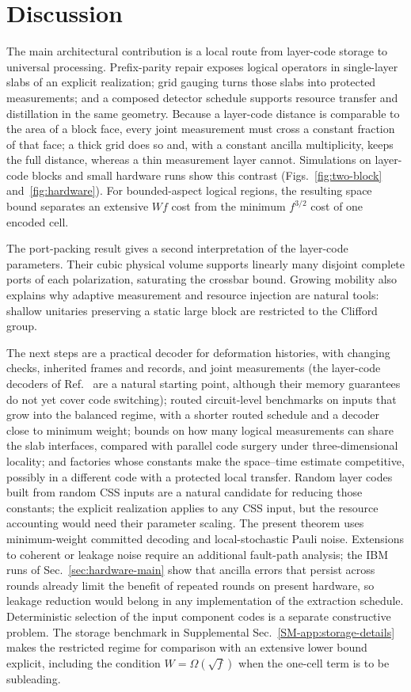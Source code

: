 \section{Discussion}
The main architectural contribution is a local route from layer-code storage
to universal processing. Prefix-parity repair exposes logical operators in
single-layer slabs of an explicit realization; grid gauging turns those slabs into protected
measurements; and a composed detector schedule supports resource transfer
and distillation in the same geometry. Because a layer-code distance is
comparable to the area of a block face, every joint measurement must cross a
constant fraction of that face; a thick grid does so and, with a constant
ancilla multiplicity, keeps the full distance, whereas a thin measurement
layer cannot.  Simulations on layer-code blocks and small hardware runs show
this contrast (Figs.~\ref{fig:two-block} and~\ref{fig:hardware}).  For
bounded-aspect logical regions,
the resulting space bound separates an extensive $Wf$ cost from the minimum
$f^{3/2}$ cost of one encoded cell.

The port-packing result gives a second interpretation of the layer-code
parameters. Their cubic physical volume supports linearly many disjoint
complete ports of each polarization, saturating the crossbar bound. Growing
mobility also explains why adaptive measurement and resource injection are
natural tools: shallow unitaries preserving a static large block are restricted
to the Clifford group.

The next steps are a practical decoder for deformation histories, with
changing checks, inherited frames and records, and joint measurements (the
layer-code decoders of Ref.~\cite{GuRandomLayerCodes2026} are a natural starting
point, although their memory guarantees do not yet cover code switching);
routed circuit-level benchmarks on inputs that grow into the balanced regime,
with a shorter routed schedule and a decoder close to minimum weight; bounds
on how many logical measurements can share
the slab interfaces, compared with parallel code surgery
\cite{CowtanParallelSurgery} under three-dimensional locality; and factories
whose constants make the space--time estimate competitive, possibly in a
different code with a protected local transfer. Random
layer codes built from random CSS inputs \cite{GuRandomLayerCodes2026} are a
natural candidate for reducing those constants; the explicit realization
applies to any CSS input, but the resource accounting would need their
parameter scaling. The present theorem uses minimum-weight committed decoding and
local-stochastic Pauli noise. Extensions to coherent or leakage noise require
an additional fault-path analysis; the IBM runs of
Sec.~\ref{sec:hardware-main} show that ancilla errors that persist across
rounds already limit the benefit of repeated rounds on present hardware, so
leakage reduction would belong in any implementation of the extraction
schedule.  Deterministic selection of the input
component codes is a separate constructive problem. The storage benchmark in
Supplemental Sec.~\ref{SM-app:storage-details} makes the restricted regime for
comparison with an extensive lower bound explicit, including the condition
$W=\Omega(\sqrt f)$ when the one-cell term is to be subleading.

